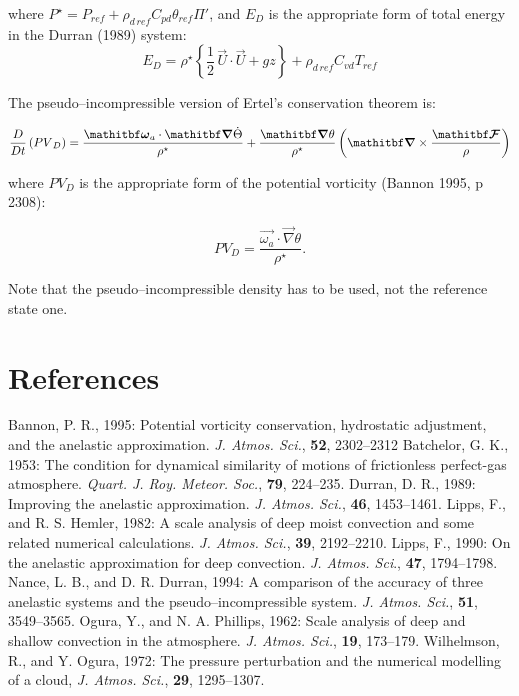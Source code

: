 where $P^{\star} = P_{ref} +  \rho_{d\,ref} C_{pd} \theta_{ref} \Pi ' $,
and $E_{D}$ is the appropriate form of total energy in the Durran (1989) system:
\begin{equation}
E_{D} = \rho^{\star} \left\{ { \frac{1}{2}\, \vec{U} \cdot \vec{U}}
           + g z \right\} + \rho_{d\,ref} C_{vd} T_{ref}
\end{equation}


The pseudo--incompressible version of Ertel's conservation theorem is:

\begin{equation}
\dfrac{D}{Dt}\left({PV}_{D}\right) =
\dfrac{\vec{\omega}_a \cdot \vec{\nabla} \dot{\Theta}}{\rho^{\star}}
+ \dfrac{\vec{\nabla}\theta}{\rho^{\star}}
\left(\vec{\nabla}\times\dfrac{\vec{\cal F}}{\rho}\right)
\end{equation}

where ${PV}_{D}$ is the appropriate form of the potential vorticity
(Bannon 1995, p 2308):

\begin{equation}
{PV}_{D} = \dfrac{\vec{\omega_a} \cdot \vec{\nabla} \theta}{\rho^{\star}}.
\end{equation}

Note that the pseudo--incompressible density has to be used, not the reference
state one.


\section{References}
\decrefname
Bannon, P. R., 1995:
Potential vorticity conservation, hydrostatic adjustment,
and the anelastic approximation.
{\it J. Atmos. Sci.}, {\bf 52}, 2302--2312
\decrefname
Batchelor, G. K., 1953:
The condition for dynamical similarity of motions of frictionless
perfect-gas atmosphere.
{\it Quart. J. Roy. Meteor. Soc.}, {\bf 79}, 224--235.
\decrefname
Durran, D. R., 1989:
Improving the anelastic approximation.
 {\it J. Atmos. Sci.}, {\bf 46}, 1453--1461.
\decrefname
Lipps, F., and R. S. Hemler, 1982:
A scale analysis of deep moist convection
and some related numerical calculations.
{\it J. Atmos. Sci.}, {\bf 39}, 2192--2210.
\decrefname
Lipps, F., 1990:
On the anelastic approximation for deep convection.
{\it J. Atmos. Sci}., {\bf 47}, 1794--1798.
\decrefname
Nance, L. B., and D. R. Durran, 1994:
A comparison of the accuracy of three anelastic systems and
the pseudo--incompressible system.
{\it J. Atmos. Sci.}, {\bf 51}, 3549--3565.
\decrefname
Ogura, Y., and N. A. Phillips, 1962:
Scale analysis of deep and shallow convection in the atmosphere.
{\it J. Atmos. Sci.}, {\bf 19}, 173--179.
\decrefname
Wilhelmson, R., and Y. Ogura, 1972:
The pressure perturbation and the numerical modelling of a cloud,
{\it J. Atmos. Sci.}, {\bf 29}, 1295--1307.

